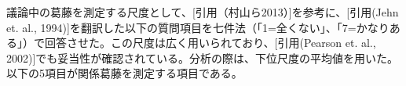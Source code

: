 \documentclass[11pt, a4paper]{jreport} %
\begin{document}
\begin{comment}
指示された立場から発言する際の意欲と責任感を測定する尺度として、以下の質問項目を七件法（「1=全くそう思わない」、「7=とてもそう思う」）で回答させた。
\begin{itemize}
\setlength{\parskip}{-0.1cm} %
  \setlength{\itemsep}{-0.1cm} %
\item 議論中に、あなたは指定された役割を果たそうとした
\item 指定された役割を果たすのは難しかった
\end{itemize}



議論に対する満足感を測定する尺度として、以下の質問項目を七件法（「1=全くそう思わない」、「7=とてもそう思う」）で回答させた。
\begin{itemize}
\setlength{\parskip}{-0.1cm} %
  \setlength{\itemsep}{-0.1cm} %
\item 先ほどの議論は楽しかった
\item 先ほどの議論に満足している
\item 先ほどの議論は深まった
\end{itemize}


議論に対する参加感を測定する尺度として、以下の質問項目を七件法（「1=全くそう思わない」、「7=とてもそう思う」）で回答させた。
\begin{itemize}
\setlength{\parskip}{-0.1cm} %
  \setlength{\itemsep}{-0.1cm} %
\item 議論に参加したという感覚が強くある
\item グループの結論に自分は貢献できた
\end{itemize}
\end{comment}


議論中の葛藤を測定する尺度として、[引用（村山ら2013）]を参考に、[引用(Jehn et. al., 1994)]を翻訳した以下の質問項目を七件法（「1=全くない」、「7=かなりある」）で回答させた。この尺度は広く用いられており、[引用(Pearson et. al., 2002)]でも妥当性が確認されている。分析の際は、下位尺度の平均値を用いた。以下の5項目が関係葛藤を測定する項目である。
\end{document}
